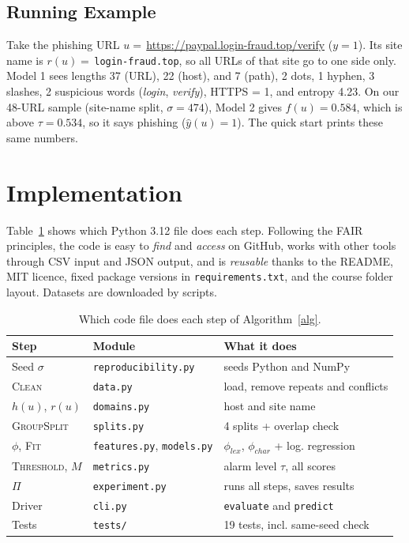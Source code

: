 \documentclass[sigconf,nonacm]{acmart}
\begin{document}
\subsection{Running Example}
Take the phishing URL $u=$\,\url{https://paypal.login-fraud.top/verify} ($y=1$). Its site name is $r(u)=$\,\texttt{login-fraud.top}, so all URLs of that site go to one side only. Model 1 sees lengths 37 (URL), 22 (host), and 7 (path), 2 dots, 1 hyphen, 3 slashes, 2 suspicious words (\emph{login}, \emph{verify}), HTTPS = 1, and entropy 4.23. On our 48-URL sample (site-name split, $\sigma=474$), Model 2 gives $f(u)=0.584$, which is above $\tau=0.534$, so it says phishing ($\hat{y}(u)=1$). The quick start prints these same numbers.

\section{Implementation}
Table~\ref{tab:code} shows which Python 3.12 file does each step. Following the FAIR principles, the code is easy to \emph{find} and \emph{access} on GitHub, works with other tools through CSV input and JSON output, and is \emph{reusable} thanks to the README, MIT licence, fixed package versions in \texttt{requirements.txt}, and the course folder layout. Datasets are downloaded by scripts.

\begin{table}[t]
\caption{Which code file does each step of Algorithm~\ref{alg}.}\label{tab:code}
\vspace{-8pt}
\scriptsize\setlength{\tabcolsep}{2pt}
\begin{tabular}{@{}lll@{}}
\toprule
Step & Module & What it does\\
\midrule
Seed $\sigma$ & \texttt{reproducibility.py} & seeds Python and NumPy\\
\textsc{Clean} & \texttt{data.py} & load, remove repeats and conflicts\\
$h(u)$, $r(u)$ & \texttt{domains.py} & host and site name\\
\textsc{GroupSplit} & \texttt{splits.py} & 4 splits + overlap check\\
$\phi$, \textsc{Fit} & \texttt{features.py}, \texttt{models.py} & $\phi_{lex}$, $\phi_{char}$ + log. regression\\
\textsc{Threshold}, $M$ & \texttt{metrics.py} & alarm level $\tau$, all scores\\
$\Pi$ & \texttt{experiment.py} & runs all steps, saves results\\
Driver & \texttt{cli.py} & \texttt{evaluate} and \texttt{predict}\\
Tests & \texttt{tests/} & 19 tests, incl. same-seed check\\
\bottomrule
\end{tabular}
\end{table}
\end{document}
